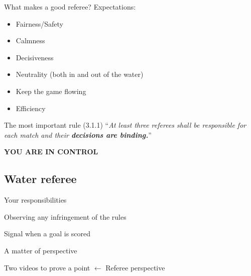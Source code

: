 \documentclass{beamer}
\begin{document}
	\begin{frame}{What makes a good referee?}
		Expectations: \pause
		\begin{itemize}
			\item Fairness/Safety \pause
			\item Calmness \pause
			\item Decisiveness \pause
			\item Neutrality (both in and out of the water) \pause
			\item Keep the game flowing \pause
			\item Efficiency
		\end{itemize}
	\end{frame}

	\begin{frame}{The most important rule}
		\pause
		(3.1.1) ``\textit{At least three referees shall be responsible for each match and their \textbf{decisions are 
binding.}}''

		\pause

		\begin{center}
			\textbf{\uppercase{You are in control}}
		\end{center}
	\end{frame}

	\subsection{Water referee}
	\begin{frame}{Your responsibilities}
		\begin{center}
			Observing any infringement of the rules

			Signal when a goal is scored
		\end{center}
	\end{frame}

	\begin{frame}{A matter of perspective}
		\begin{center}
			Two videos to prove a point $\leftarrow$ Referee perspective
		\end{center}
	\end{frame}
\end{document}
